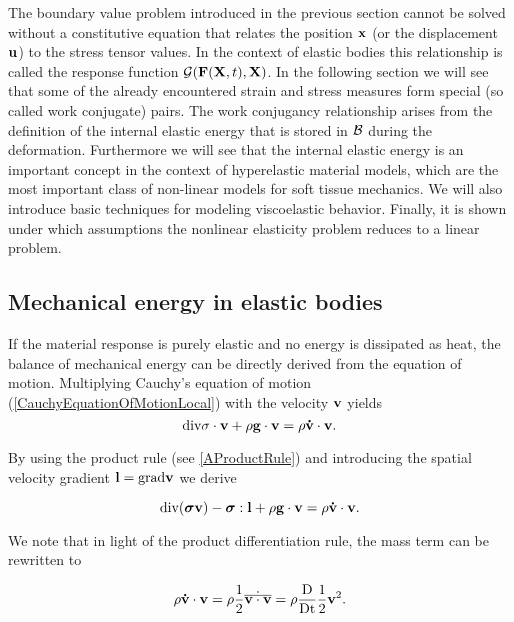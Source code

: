 The boundary value problem introduced in the previous section cannot be solved without a constitutive equation that relates the position $\mathbf {x} $ (or the displacement $\mathbf {u} $) to the stress tensor values. In the context of elastic bodies this relationship is called the response function $\mathcal G  (\mathbf {F }(\mathbf {X} ,t), \mathbf {X} )$. In the following section we will see that some of the already encountered strain and stress measures form special (so called work conjugate) pairs. The work conjugancy relationship arises from the definition of the internal elastic energy that is stored in $\mathcal{B} $ during the deformation. Furthermore we will see that the internal elastic energy is an important concept in the context of hyperelastic material models, which are the most important class of non-linear models for soft tissue mechanics. We will also introduce basic techniques for modeling viscoelastic behavior. Finally, it is shown under which assumptions the nonlinear elasticity problem reduces to a linear problem.



\subsection{Mechanical energy in elastic bodies}
\label{SectionMechanicalEnergyInElasticBodies}

If the material response is purely elastic and no energy is dissipated as heat, the balance of mechanical energy can be directly derived from the equation of motion. Multiplying Cauchy's equation of motion (\ref{CauchyEquationOfMotionLocal}) with the velocity $\mathbf {v} $ yields
 \begin{equation}
  \textnormal{div} \sigma \cdot \mathbf {v}     +    \rho \mathbf {g}  \cdot \mathbf {v}   =  \rho \mathbf {\dot v} \cdot \mathbf {v} .
\end{equation}

By using the product rule (see \ref{AProductRule}) and introducing the spatial velocity gradient $\mathbf {l}  =  \textnormal{grad} \mathbf {v} $ we derive

 \begin{equation}
  \textnormal{div}( \boldsymbol{\sigma} \mathbf {v}  )  -  \boldsymbol{\sigma} : \mathbf {l}      +    \rho \mathbf {g}  \cdot \mathbf {v}   =  \rho \mathbf {\dot v}  \cdot \mathbf {v} .
\label{DerivationMechEnergy}
\end{equation}

We note that in light of the product differentiation rule, the mass term can be rewritten to

 \begin{equation}
\rho \mathbf {\dot v}  \cdot \mathbf {v}  = \rho \frac{1}{2} \dot{\overline{\mathbf {v}  \cdot \mathbf {v} } } = \rho \frac{\textnormal{D}}{\textnormal{Dt}} \frac{1}{2} \mathbf {v}  ^2.
\end{equation}


